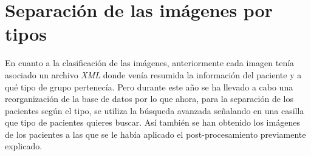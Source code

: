 \section{Separación de las imágenes por tipos}

En cuanto a la clasificación de las imágenes, anteriormente cada imagen tenía asociado un archivo \textit{XML} donde venía resumida la información del paciente y a qué tipo de grupo pertenecía. Pero durante este año se ha llevado a cabo una reorganización de la base de datos por lo que ahora, para la separación de los pacientes según el tipo, se utiliza la búsqueda avanzada señalando en una casilla que tipo de pacientes quieres buscar. Así también se han obtenido los imágenes de los pacientes a las que se le había aplicado el post-procesamiento previamente explicado.